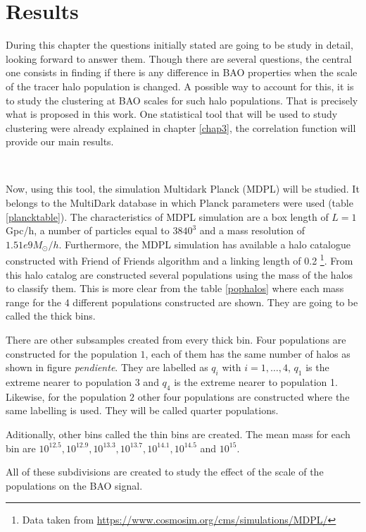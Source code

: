 \chapter{ Results }

During this chapter the questions initially stated are going to be study in detail, 
looking forward to answer them. Though there are several questions, the central one
consists in finding if there is any difference in BAO properties when the scale of the tracer
halo population is changed. A possible way to account for this, it is to study the 
clustering at BAO scales for such halo populations. That is precisely what is proposed
in this work. 
One statistical tool that will be used to study clustering were already explained in chapter \ref{chap3},
the correlation function will provide our main results. 

\

Now, using this tool, the simulation Multidark Planck (MDPL) will be studied. 
It belongs to the MultiDark database in which Planck parameters were used
(table \ref{plancktable}). The characteristics of MDPL
simulation are a box length of $L=1$Gpc/h, a number of particles equal to 
$3840^3$ and a mass resolution of $1.51e9 M_{\odot}/h$.
Furthermore, the MDPL simulation has available a halo catalogue constructed with Friend of 
Friends algorithm and a linking length of 0.2 \footnote{ Data taken from \url{https://www.cosmosim.org/cms/simulations/MDPL/}}. 
From this halo catalog are constructed several populations using the mass of the halos to
classify them. This is more clear from the table \ref{pophalos} where each mass range for 
the 4 different populations constructed are shown. They are going to be called the 
thick bins. 

There are other subsamples created from every thick bin.
Four populations are constructed for the population $1$, each of them has the same
number of halos as shown in figure \textit{pendiente}. 
They are labelled as $q_i$ with $i=1,\dots,4$, $q_1$ is the extreme 
nearer to population 3 and $q_4$ is the extreme nearer to population 1. 
Likewise, for the population $2$ other four populations are constructed where
the same labelling is used. They will be called quarter populations. 

Aditionally, other bins called the thin bins are created. The mean mass for each 
bin are $10^{12.5}, 10^{12.9}, 10^{13.3}, 10^{13.7}, 10^{14.1}, 10^{14.5}$ and $10^{15}$. 

All of these subdivisions are created to study the effect of the scale of the populations 
on the BAO signal. 


